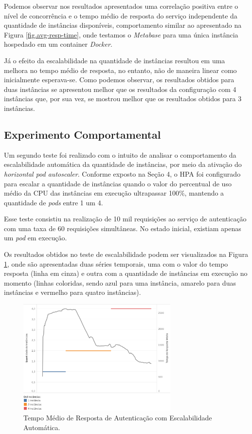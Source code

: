 Podemos observar nos resultados apresentados uma correlação positiva entre o nível de concorrência e o tempo médio de resposta do serviço independente da quantidade de instâncias disponíveis, comportamento similar ao apresentado na Figura \ref{fig.avg-resp-time}, onde testamos o \textit{Metabase} para uma única instância hospedado em um container \textit{Docker}. 

Já o efeito da escalabilidade na quantidade de instâncias resultou em uma melhora no tempo médio de resposta, no entanto, não de maneira linear como inicialmente esperava-se. Como podemos observar, os resultados obtidos para duas instâncias se apresentou melhor que os resultados da configuração com 4 instâncias que, por sua vez, se mostrou melhor que os resultados obtidos para 3 instâncias. 

\subsection{Experimento Comportamental}

Um segundo teste foi realizado com o intuito de analisar o comportamento da escalabilidade automática da quantidade de instâncias, por meio da ativação do \textit{horizontal pod autoscaler}. Conforme exposto na Seção 4, o HPA foi configurado para escalar a quantidade de instâncias quando o valor do percentual de uso médio da CPU das instâncias em execução ultrapassar 100\%, mantendo a quantidade de \textit{pods} entre 1 um 4. 

Esse teste consistiu na realização de 10 mil requisições ao serviço de autenticação com uma taxa de 60 requisições simultâneas. No estado inicial, existiam apenas um \textit{pod} em execução. 

Os resultados obtidos no teste de escalabilidade podem ser visualizados na Figura \ref{fig.avg-resp-time-hpa}, onde são apresentadas duas séries temporais, uma com o valor do tempo resposta (linha em cinza) e outra com a quantidade de instâncias em execução no momento (linhas coloridas, sendo azul para uma instância, amarelo para duas instâncias e vermelho para quatro instâncias).

\begin{figure}[htp]
   \centering
    \includegraphics[width=8cm]{Imagens/Performance-HPA}
    \caption{Tempo Médio de Resposta de Autenticação com Escalabilidade Automática.}
    \label{fig.avg-resp-time-hpa}
\end{figure} 

